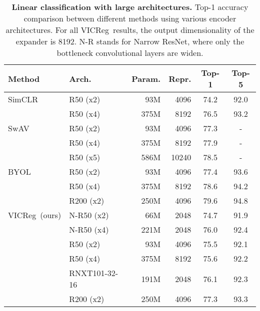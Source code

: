 \documentclass{article}
\newcommand{\algo}{VICReg}
\begin{document}
\begin{table}[t]
\caption{\textbf{Linear classification with large architectures.} Top-1 accuracy comparison between different methods using various encoder architectures. For all \algo \ results, the output dimensionality of the expander is 8192. N-R stands for Narrow ResNet, where only the bottleneck convolutional layers are widen.}
\label{tab:large_arch}
\vspace{-6mm}
\vskip 0.15in
\begin{center}
\begin{tabular}{llrrcc}
\toprule
Method & Arch. & Param. & Repr. & Top-1 & Top-5 \\
\midrule
SimCLR \cite{chen2020simclr}    & R50 (x2)   &   93M     &   4096    &   74.2    &   92.0    \\
  & R50 (x4)   &   375M    &   8192    &   76.5    &   93.2    \\
\midrule
SwAV \cite{caron2020swav}& R50 (x2)    &   93M     &   4096    &   77.3    &   -    \\
 & R50 (x4)    &   375M    &   8192    &   77.9    &   -    \\
 & R50 (x5)    &   586M    &   10240   &   78.5    &   -    \\
\midrule
BYOL \cite{grill2020byol}& R50 (x2)    &   93M     &   4096    &   77.4    &   93.6    \\
 & R50 (x4)    &   375M    &   8192    &   78.6    &   94.2    \\
 & R200 (x2)   &   250M    &   4096    &   79.6    &   94.8    \\
\midrule
\algo \ (ours) & N-R50 (x2)    &   66M     &   2048    &   74.7    &   91.9    \\
 & N-R50 (x4)    &   221M    &   2048    &   76.0    &   92.4  \\
 & R50 (x2)    &   93M     &   4096    &   75.5    &   92.1    \\
 & R50 (x4)    &   375M    &   8192    &   75.6    &   92.2    \\
 & RNXT101-32-16 &   191M    &   2048    &   76.1    &   92.3  \\
 & R200 (x2)   &   250M    &   4096    &   77.3    &   93.3    \\
\bottomrule
\end{tabular}
\end{center}
\end{table}
\end{document}
